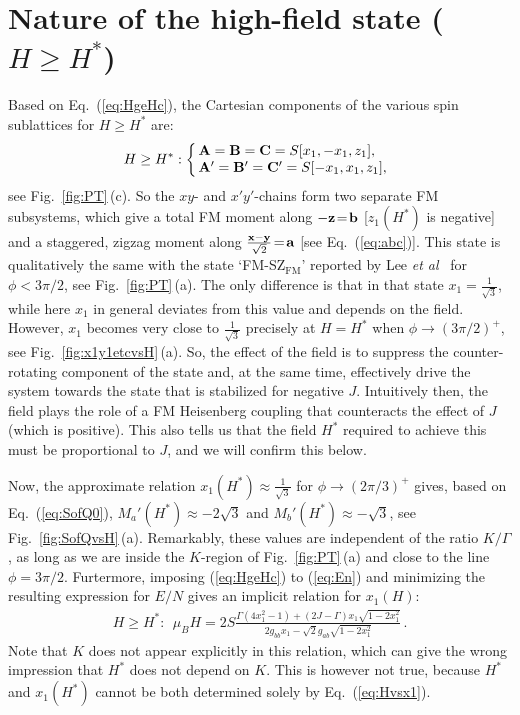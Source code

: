 \documentclass[prx,aps,groupedaddress,twocolumn]{revtex4-1}
\def\cdbl{\color{darkblue}}
\def\be{\begin{equation}}
\def\ee{\end{equation}}
\begin{document}
\vspace*{-0.25cm}
\section{Nature of the high-field state ($H\ge H^\ast$)}
\vspace*{-0.3cm}
Based on Eq.~(\ref{eq:HgeHc}), the Cartesian components of the various spin sublattices for $H\!\ge\!H^\ast$ are:
\be\label{eq:StateHc}
H\ge H^\ast:
\left\{\!\!
\begin{array}{l}
{\bf A}={\bf B}={\bf C}=S [x_1,-x_1,z_1],\\
{\bf A}'={\bf B}'={\bf C}'= S [-x_1,x_1,z_1],
\end{array}
\right.
\ee
see Fig.~\ref{fig:PT}\,(c).  
%
So the $xy$- and $x'y'$-chains form two separate FM subsystems, which give a total FM moment along $-{\bf z}\!=\!{\bf b}$ [$z_1(H^\ast)$ is negative] and a staggered, zigzag moment along $\frac{{\bf x}-{\bf y}}{\sqrt{2}}\!=\!{\bf a}$ [see Eq.~(\ref{eq:abc})].  
%
This state is qualitatively the same with the state `FM-SZ$_{\text{FM}}$' reported by Lee {\it et al}~\cite{Lee2015,Lee2016} for $\phi\!<\!3\pi/2$, see Fig.~\ref{fig:PT}\,(a). 
%
The only difference is that in that state $x_1\!=\!\frac{1}{\sqrt{3}}$, while here $x_1$ in general deviates from this value and depends on the field. 
%
However, $x_1$ becomes very close to $\frac{1}{\sqrt{3}}$ precisely at $H\!=\!H^\ast$ when $\phi\!\to\!(3\pi/2)^+$, see Fig.~\ref{fig:x1y1etcvsH}\,(a).  
%
So, the effect of the field is to suppress the counter-rotating component of the state  and, at the same time, effectively drive the system towards the state that is stabilized for negative $J$. Intuitively then, the field plays the role of a FM Heisenberg coupling that counteracts the effect of $J$ (which is positive). 
%
This also tells us that the field $H^\ast$ required to achieve this must be proportional to $J$, and we will confirm this below. 

Now, the approximate relation $x_1(H^\ast)\!\approx\!\frac{1}{\sqrt{3}}$ for $\phi\!\to\!(2\pi/3)^+$ gives, based on Eq.~(\ref{eq:SofQ0}), $M_a'(H^\ast)\approx -2\sqrt{3}$ and $M_b'(H^\ast)\approx -\sqrt{3}$, see Fig.~\ref{fig:SofQvsH}\,(a). Remarkably, these values are independent of the ratio $K/\Gamma$, as long as we are inside the $K$-region of Fig.~\ref{fig:PT}\,(a) and close to the line $\phi\!=\!3\pi/2$. 
%
Furtermore, imposing (\ref{eq:HgeHc}) to (\ref{eq:En}) and minimizing the resulting expression for $E/N$ gives an implicit relation for $x_1(H)$:
\be\label{eq:Hvsx1}
\begin{array}{c}
H\ge H^\ast:~~\mu_B H = 2S \frac{\Gamma(4x_1^2-1)+(2J-\Gamma)x_1 \sqrt{1-2x_1^2}}{2g_{bb} x_1-\sqrt{2} g_{ab}\sqrt{1-2x_1^2}}\,.
\end{array}
\ee
Note that $K$ does not appear explicitly in this relation, which can give the wrong impression that $H^\ast$ does not depend on $K$. This is however not true, because %
$H^\ast$ and $x_1(H^\ast)$ %
cannot be both determined solely by Eq.~(\ref{eq:Hvsx1}).
\end{document}

